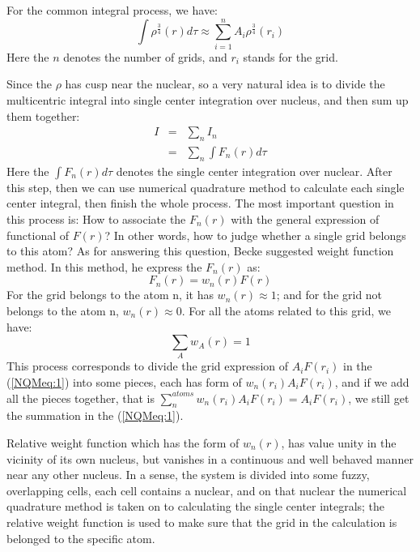 For the common integral process, we have:
\begin{equation}\label{}
    \int \rho^{\frac{3}{4}}(r) d \tau \approx \sum_{i=1}^{n}
A_{i} \rho^{\frac{3}{4}}(r_{i})
\end{equation}
Here the $n$ denotes the number of grids, and $r_{i}$  stands for
the grid.

Since the $\rho$ has cusp near the nuclear, so a very natural idea
is to divide the multicentric integral into single center
integration over nucleus, and then sum up them together:
\begin{eqnarray}
  I &=& \sum_{n} I_{n} \nonumber \\
    &=& \sum_{n} \int F_{n}(r) d \tau
\end{eqnarray}
Here the $\int F_{n}(r) d \tau$ denotes the single center
integration over nuclear. After this step, then we can use numerical
quadrature method to calculate each single center integral, then
finish the whole process. The most important question in this
process is: How to associate the $F_{n}(r)$ with the general
expression of functional of $F(r)$? In other words, how to judge
whether a single grid belongs to this atom? As for answering this
question, Becke suggested weight function method. In this method, he
express the $F_{n}(r)$ as:
\begin{equation}\label{}
F_{n}(r) = w_{n}(r)F(r)
\end{equation}
For the grid belongs to the atom n, it has $w_{n}(r) \approx 1$; and
for the grid not belongs to the atom n, $w_{n}(r) \approx 0$. For
all the atoms related to this grid, we have:
\begin{equation}\label{}
\sum_{A}w_{A}(r) = 1
\end{equation}
This process corresponds to divide the grid expression of
$A_{i}F(r_{i})$ in the (\ref{NQMeq:1}) into some pieces, each has
form of $w_{n}(r_{i})A_{i}F(r_{i})$, and if we add all the pieces
together, that is $\sum^{atoms}_{n}w_{n}(r_{i})A_{i}F(r_{i}) =
A_{i}F(r_{i}) $, we still get the summation in the (\ref{NQMeq:1}).

Relative weight function which has the form of $w_{n}(r)$,
has value unity in the vicinity of its own nucleus, but vanishes in
a continuous and well behaved manner near any other nucleus. In a
sense, the system is divided into some fuzzy, overlapping cells,
each cell contains a nuclear, and on that nuclear the numerical
quadrature method is taken on to calculating the single center
integrals; the relative weight function is used to make sure that
the grid in the calculation is belonged to the specific atom. 

